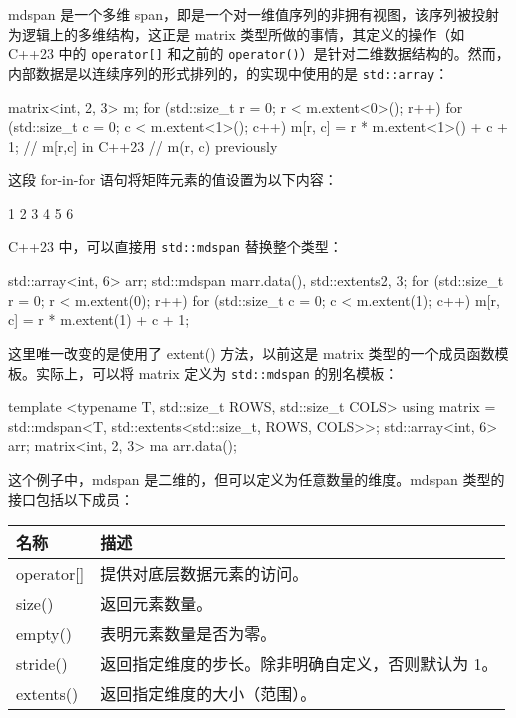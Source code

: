 
mdspan 是一个多维 span，即是一个对一维值序列的非拥有视图，该序列被投射为逻辑上的多维结构，这正是 matrix 类型所做的事情，其定义的操作（如 C++23 中的 \verb|operator[]| 和之前的 \verb|operator()|）是针对二维数据结构的。然而，内部数据是以连续序列的形式排列的，的实现中使用的是 \verb|std::array|：

\begin{cpp}
matrix<int, 2, 3> m;
for (std::size_t r = 0; r < m.extent<0>(); r++)
{
    for (std::size_t c = 0; c < m.extent<1>(); c++)
    {
        m[r, c] = r * m.extent<1>() + c + 1; // m[r,c] in C++23
        // m(r, c) previously
    }
}
\end{cpp}

这段 for-in-for 语句将矩阵元素的值设置为以下内容：

\begin{shell}
1 2 3
4 5 6
\end{shell}

C++23 中，可以直接用 \verb|std::mdspan| 替换整个类型：

\begin{cpp}
std::array<int, 6> arr;
std::mdspan m{arr.data(), std::extents{2, 3}};
for (std::size_t r = 0; r < m.extent(0); r++)
{
    for (std::size_t c = 0; c < m.extent(1); c++)
    {
        m[r, c] = r * m.extent(1) + c + 1;
    }
}
\end{cpp}

这里唯一改变的是使用了 extent() 方法，以前这是 matrix 类型的一个成员函数模板。实际上，可以将 matrix 定义为 \verb|std::mdspan| 的别名模板：

\begin{cpp}
template <typename T, std::size_t ROWS, std::size_t COLS>
using matrix = std::mdspan<T, std::extents<std::size_t, ROWS, COLS>>;
std::array<int, 6> arr;
matrix<int, 2, 3> ma {arr.data()};
\end{cpp}

这个例子中，mdspan 是二维的，但可以定义为任意数量的维度。mdspan 类型的接口包括以下成员：

\begin{longtable}{|l|l|}
\hline
\textbf{名称} & \textbf{描述}                                    \\ \hline
\endfirsthead
%
\endhead
%
operator[]    & 提供对底层数据元素的访问。 \\ \hline
size()        & 返回元素数量。                         \\ \hline
empty()       & 表明元素数量是否为零。       \\ \hline
stride() & 返回指定维度的步长。除非明确自定义，否则默认为 1。 \\ \hline
extents()     & 返回指定维度的大小（范围）。   \\ \hline
\end{longtable}

